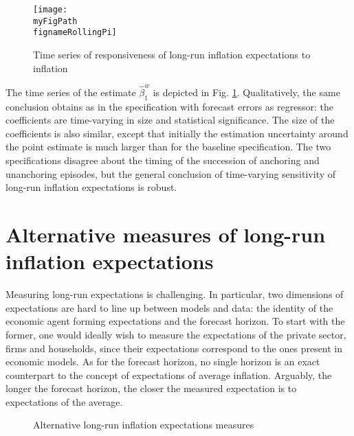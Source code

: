 \documentclass[11pt]{article}
\def \myFigPath {../../figures/}
\renewcommand{\[}{\begin{equation}}
\renewcommand{\]}{\end{equation}}
\def\myFigScale{0.3}
\def\fignameMarketEPiMoreHorizons{epi_be_in_data_command_anchoring_in_data_14_Sep_2020_18_12_59}
\def\fignameSPFLiv{epi_in_data_command_anchoring_in_data_14_Sep_2020_18_12_59}
\def\fignameRollingPi{rolling_overlapping_pi_command_anchoring_in_data_individual_25_Sep_2020_10_37_43} %
\begin{document}
\begin{figure}[h!]
\texttt{[image: \\myFigPath \\fignameRollingPi]}
\caption{Time series of responsiveness of long-run inflation expectations to inflation}
\label{rolling_pi}
\end{figure}

The time series of the estimate $\hat{\beta}^w_1$ is depicted in Fig. \ref{rolling_pi}. Qualitatively, the same conclusion obtains as in the specification with forecast errors as regressor: the coefficients are time-varying in size and statistical significance. The size of the coefficients is also similar, except that initially the estimation uncertainty around the point estimate is much larger than for the baseline specification. The two specifications disagree about the timing of the succession of anchoring and unanchoring episodes, but the general conclusion of time-varying sensitivity of long-run inflation expectations is robust. 


\section{Alternative measures of long-run inflation expectations}\label{unanchoring_in_data}

Measuring long-run expectations is challenging. In particular, two dimensions of expectations are hard to line up between models and data: the identity of the economic agent forming expectations and the forecast horizon. To start with the former, one would ideally wish to measure the expectations of the private sector, firms and households, since their expectations correspond to the ones present in economic models. As for the forecast horizon, no single horizon is an exact counterpart to the concept of expectations of average inflation. Arguably, the longer the forecast horizon, the closer the measured expectation is to expectations of the average.

\begin{figure}[h!]
\caption{Alternative long-run inflation expectations measures}
\label{epi_alternative}
\end{figure}
\end{document}

